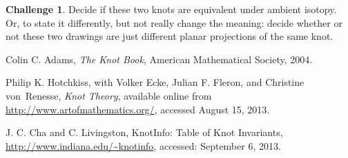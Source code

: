 \documentclass[12pt,letterpaper]{article}
\theoremstyle{definition}
\newtheorem*{challenge}{Challenge}
\begin{document}
\begin{challenge}
Decide if these two knots are equivalent under ambient isotopy.
Or, to state it differently, but not really change the meaning: decide whether or not these two drawings are just different planar projections of the same knot.
\end{challenge}


\begin{thebibliography}{9}

	Colin C. Adams,
	\emph{The Knot Book},
	American Mathematical Society, 
	2004.

	Philip K. Hotchkiss, with Volker Ecke, Julian F. Fleron, and Christine von~Renesse,
	\emph{Knot Theory},
	available online from \url{http://www.artofmathematics.org/}, 
	accessed August 15, 2013.

	J. C. Cha and C. Livingston, 
	KnotInfo: Table of Knot Invariants, 
	\url{http://www.indiana.edu/~knotinfo}, 
	accessed: September 6, 2013.

\end{thebibliography}
\end{document}
